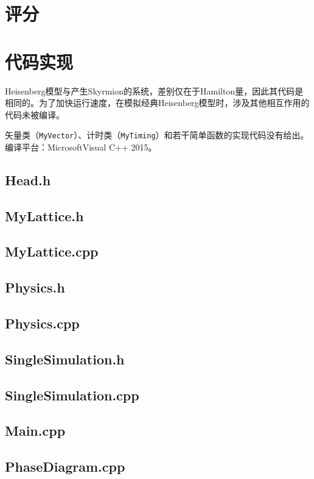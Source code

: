 \documentclass{article}
\begin{document}
	\section{评分}
	\section{代码实现}
		Heisenberg模型与产生Skyrmion的系统，差别仅在于Hamilton量，因此其代码是相同的。为了加快运行速度，在模拟经典Heisenberg模型时，涉及其他相互作用的代码未被编译。
		
		矢量类（\texttt{MyVector}）、计时类（\texttt{MyTiming}）和若干简单函数的实现代码没有给出。编译平台：Microsoft\textregistered\;Visual C++ 2015。
		\linespread{1}
		\subsection{Head.h}
		
		\subsection{MyLattice.h}
		
		\subsection{MyLattice.cpp}
		
		\subsection{Physics.h}
		
		\subsection{Physics.cpp}
		
		\subsection{SingleSimulation.h}
		
		\subsection{SingleSimulation.cpp}
		
		\subsection{Main.cpp}
		
		\subsection{PhaseDiagram.cpp}
		
\end{document}

